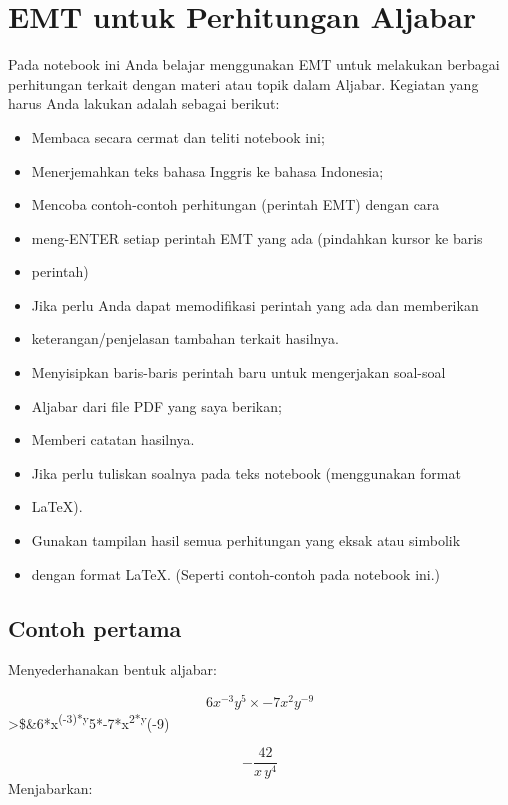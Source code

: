 \documentclass[
]{book}
\author{}
\date{}
\begin{document}
\frontmatter

\mainmatter
\chapter{EMT untuk Perhitungan Aljabar}\label{emt-untuk-perhitungan-aljabar}

Pada notebook ini Anda belajar menggunakan EMT untuk melakukan berbagai perhitungan terkait dengan materi atau topik dalam Aljabar. Kegiatan yang harus Anda lakukan adalah sebagai berikut:

\begin{itemize}
\item
  Membaca secara cermat dan teliti notebook ini;
\item
  Menerjemahkan teks bahasa Inggris ke bahasa Indonesia;
\item
  Mencoba contoh-contoh perhitungan (perintah EMT) dengan cara
\item
  meng-ENTER setiap perintah EMT yang ada (pindahkan kursor ke baris
\item
  perintah)
\item
  Jika perlu Anda dapat memodifikasi perintah yang ada dan memberikan
\item
  keterangan/penjelasan tambahan terkait hasilnya.
\item
  Menyisipkan baris-baris perintah baru untuk mengerjakan soal-soal
\item
  Aljabar dari file PDF yang saya berikan;
\item
  Memberi catatan hasilnya.
\item
  Jika perlu tuliskan soalnya pada teks notebook (menggunakan format
\item
  LaTeX).
\item
  Gunakan tampilan hasil semua perhitungan yang eksak atau simbolik
\item
  dengan format LaTeX. (Seperti contoh-contoh pada notebook ini.)
\end{itemize}

\section{Contoh pertama}\label{contoh-pertama}

Menyederhanakan bentuk aljabar:

\[6x^{-3}y^5\times -7x^2y^{-9}\]\textgreater\$\&6*x\textsuperscript{(-3)*y}5*-7*x\textsuperscript{2*y}(-9)

\[-\frac{42}{x\,y^4}\]Menjabarkan:
\end{document}
